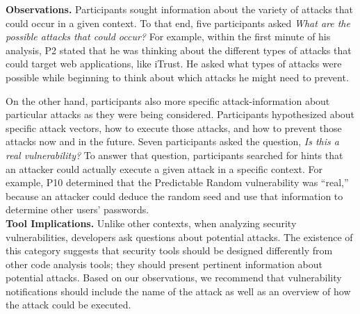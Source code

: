 \documentclass[conference]{IEEEtran}
\begin{document}
\noindent\textbf{Observations.}
Participants sought information about the variety of attacks that could occur in a given context.
To that end, five participants asked \textit{What are the possible attacks that could occur?}
For example, within the first minute of his analysis, P2 stated that he was thinking about the different types of attacks that could target web applications, like iTrust. He asked what types of attacks were possible while beginning to think about which attacks he might need to prevent.

On the other hand, participants also more specific attack-information about particular attacks as they were being considered.
Participants hypothesized about specific attack vectors, how to execute those attacks, and how to prevent those attacks now and in the future.
Seven participants asked the question, \textit{Is this a real vulnerability?} To answer that question, participants searched for hints that an attacker could actually execute a given attack in a specific context. For example, P10 determined that the Predictable Random vulnerability was ``real,'' because an attacker could deduce the random seed and use that information to determine other users' passwords. 
\\

\noindent\textbf{Tool Implications.}
Unlike other contexts, when analyzing security vulnerabilities, developers ask questions about potential attacks.
The existence of this category suggests that security tools should be designed differently from other code analysis tools; they should present pertinent information about potential attacks. 
Based on our observations, we recommend that vulnerability notifications should include the name of the attack as well as an overview of how the attack could be executed.
\end{document}
